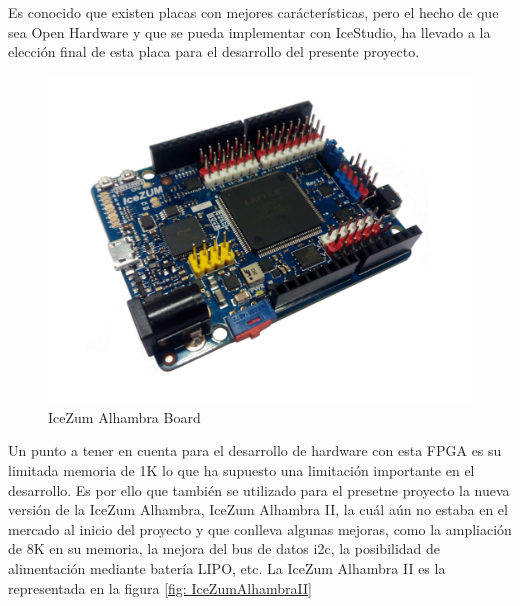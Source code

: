 Es conocido que existen placas con mejores carácterísticas, pero el hecho de que sea Open Hardware y que se pueda implementar con IceStudio, ha llevado a la elección final de esta placa para el desarrollo del presente proyecto.\newline
\begin{center}
\begin{figure}[H]
	\center
	\includegraphics[scale=0.4]{imagenes/EstadoArte/IceZumAlhambra.pdf}
	\caption{IceZum Alhambra Board}
	\label{fig:IceZumAlhambraI}
\end{figure} 
\end{center}
Un punto a tener en cuenta para el desarrollo de hardware con esta FPGA es su limitada memoria de 1K lo que ha supuesto una limitación importante en el desarrollo. Es por ello que también se utilizado para el presetne proyecto la nueva versión de la IceZum Alhambra, IceZum Alhambra II, la cuál aún no estaba en el mercado al inicio del proyecto y que conlleva algunas mejoras, como la ampliación de 8K en su memoria, la mejora del bus de datos i2c, la posibilidad de alimentación mediante batería LIPO, etc. \newline
La IceZum Alhambra II es la representada en la figura \ref{fig: IceZumAlhambraII}

